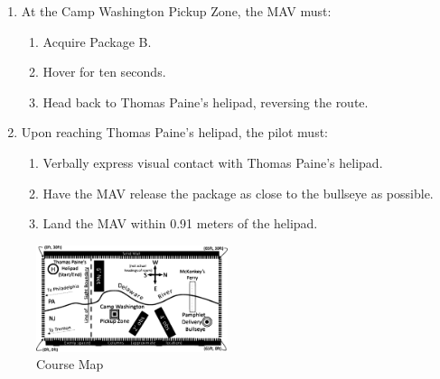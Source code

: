 \documentclass[onecolumn, oneside, letterpaper, draftclsnofoot, 10pt, compsoc]{IEEEtran}
\begin{document}
\begin{enumerate}
\begin{enumerate}
\end{enumerate}
\item At the Camp Washington Pickup Zone, the MAV must:
\begin{enumerate}
\item Acquire Package B.
\item Hover for ten seconds.
\item Head back to Thomas Paine’s helipad, reversing the route.
\end{enumerate}
\item Upon reaching Thomas Paine’s helipad, the pilot must:
\begin{enumerate}
\item Verbally express visual contact with Thomas Paine’s helipad.
\item Have the MAV release the package as close to the bullseye as possible.
\item Land the MAV within 0.91 meters of the helipad.
\end{enumerate}
\end{enumerate}
\begin{figure}[h]
    \centering
    \includegraphics[width=0.5\textwidth]{graphics/course_map.eps}
    \caption{Course Map}
    \label{fig:CourseMap}
\end{figure}
\end{document}
